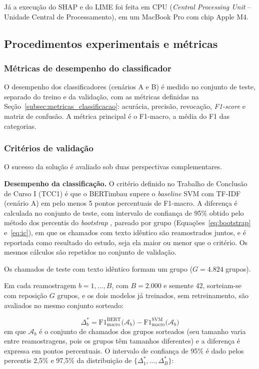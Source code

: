 \documentclass[
    12pt,                %
    openright,           %
    oneside,             %
    a4paper,             %
    english,             %
    brazil               %
]{abntex2}
\begin{document}
Já a execução do SHAP e do LIME foi feita em CPU (\textit{Central Processing Unit} -- Unidade Central de Processamento), em um MacBook Pro com chip Apple M4.

\subsection{Procedimentos experimentais e métricas}
\subsubsection{Métricas de desempenho do classificador}
\label{sec:metricas_avaliacao}

O desempenho dos classificadores (cenários A e B) é medido no conjunto de teste, separado do treino e da validação, com as métricas definidas na Seção~\ref{subsec:metricas_classificacao}: acurácia, precisão, revocação, \textit{F1-score} e matriz de confusão. A métrica principal é o F1-macro, a média do F1 das categorias.

\subsubsection{Critérios de validação}
\label{subsec:criterios_validacao}

O sucesso da solução é avaliado sob duas perspectivas complementares.

\textbf{Desempenho da classificação.} O critério definido no Trabalho de Conclusão de Curso I (TCC1) é que o BERTimbau supere o \textit{baseline} SVM com TF-IDF (cenário A) em pelo menos 5 pontos percentuais de F1-macro. A diferença é calculada no conjunto de teste, com intervalo de confiança de 95\% obtido pelo método dos percentis do \textit{bootstrap} \cite{efron1993}, pareado por grupo (Equações~\ref{eq:bootstrap} e~\ref{eq:ic}), em que os chamados com texto idêntico são reamostrados juntos, e é reportada como resultado do estudo, seja ela maior ou menor que o critério. Os mesmos cálculos são repetidos no conjunto de validação. %

Os chamados de teste com texto idêntico formam um grupo ($G = 4.824$ grupos).

Em cada reamostragem $b = 1, \dots, B$, com $B = 2.000$ e semente 42, sorteiam-se com reposição $G$ grupos, e os dois modelos já treinados, sem retreinamento, são avaliados no mesmo conjunto sorteado:

\begin{equation}
\Delta_b^{*} = \mathrm{F1}_{\mathrm{macro}}^{\mathrm{BERT}}\big(\mathcal{A}_b\big) - \mathrm{F1}_{\mathrm{macro}}^{\mathrm{SVM}}\big(\mathcal{A}_b\big)
\label{eq:bootstrap}
\end{equation}
em que $\mathcal{A}_b$ é o conjunto de chamados dos grupos sorteados (seu tamanho varia entre reamostragens, pois os grupos têm tamanhos diferentes) e a diferença é expressa em pontos percentuais. O intervalo de confiança de 95\% é dado pelos percentis 2,5\% e 97,5\% da distribuição de $\{\Delta^{*}_1,\dots,\Delta^{*}_B\}$:
\end{document}
